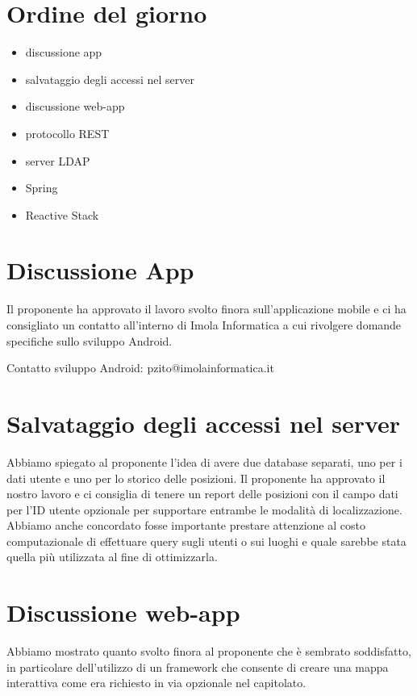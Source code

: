 \documentclass{article}
\begin{document}
\section{Ordine del giorno}%
\label{sec:ordine_del_giorno}

\begin{itemize}
  \item discussione app
  \item salvataggio degli accessi nel server
  \item discussione web-app
  \item protocollo REST
  \item server LDAP
  \item Spring
  \item Reactive Stack
\end{itemize}

\section{Discussione App}%
\label{sec:discussione_app}
Il proponente ha approvato il lavoro svolto finora sull'applicazione mobile e ci ha consigliato un contatto all'interno di Imola Informatica a cui rivolgere domande specifiche sullo sviluppo Android.
\begin{center}
  Contatto sviluppo Android: pzito@imolainformatica.it
\end{center}

\section{Salvataggio degli accessi nel server}%
\label{sec:salvataggio_accessi_server}
Abbiamo spiegato al proponente l'idea di avere due database separati, uno per i dati utente e uno per lo storico delle posizioni.
Il proponente ha approvato il nostro lavoro e ci consiglia di tenere un report delle posizioni con il campo dati per l'ID utente opzionale per supportare entrambe le modalità di localizzazione.
Abbiamo anche concordato fosse importante prestare attenzione al costo computazionale di effettuare query sugli utenti o sui luoghi e quale sarebbe stata quella più utilizzata al fine di ottimizzarla.

\section{Discussione web-app}%
\label{sec:discussione_web_app}
Abbiamo mostrato quanto svolto finora al proponente che è sembrato soddisfatto, in particolare dell'utilizzo di un framework che consente di creare una mappa interattiva come era richiesto in via opzionale nel capitolato.
\end{document}
